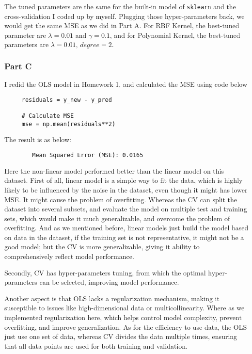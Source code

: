 \documentclass[letterpaper]{article}
\begin{document}
   The tuned parameters are the same for the built-in model of \texttt{sklearn} and the cross-validation I coded up by myself. Plugging those hyper-parameters back, we would get the same MSE as we did in Part A. For RBF Kernel, the best-tuned parameter are $\lambda=0.01$ and $\gamma=0.1$, and for Polynomial Kernel, the best-tuned parameters are $\lambda=0.01$, $degree=2$.

		\subsubsection{Part C}
		
		I redid the OLS model in Homework 1, and calculated the MSE using code below
		
		\begin{lstlisting}
     residuals = y_new - y_pred
     
     # Calculate MSE
     mse = np.mean(residuals**2)
		\end{lstlisting}
		
		The result is as below:
		
		\begin{minipage}{\linewidth}
	\begin{Verbatim}
		Mean Squared Error (MSE): 0.0165
	\end{Verbatim}
\end{minipage}

       Here the non-linear model performed better than the linear model on this dataset. First of all, linear model is a simple way to fit the data, which is highly likely to be influenced by the noise in the dataset, even though it might has lower MSE. It might cause the problem of overfitting. Whereas the CV can split the dataset into several subsets, and evaluate the model on multiple test and training sets, which would make it much generalizable, and overcome the problem of overfitting. And as we mentioned before, linear models just build the model based on data in the dataset, if the training set is not representative, it might not be a good model; but the CV is more generalizable, giving it ability to comprehensively reflect model performance.
       
       Secondly, CV has hyper-parameters tuning, from which  the optimal hyper-parameters can be selected, improving model performance.
       
       Another aspect is that OLS lacks a regularization mechanism, making it susceptible to issues like high-dimensional data or multicollinearity. Where as we implemented regularization here, which helps control model complexity, prevent overfitting, and improve generalization. As for the efficiency to use data, the OLS just use one set of data, whereas CV divides the data multiple times, ensuring that all data points are used for both training and validation.
      
\end{document}
